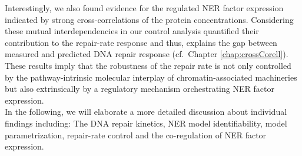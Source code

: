 Interestingly, we also found evidence for the regulated NER factor expression indicated by strong cross-correlations of the protein concentrations. Considering these mutual interdependencies in our control analysis quantified their contribution to the repair-rate response and thus, explains the gap between measured and predicted DNA repair response (cf.\ Chapter \ref{chap:crossCorell}). These results imply that the robustness of the repair rate is not only controlled by the pathway-intrinsic molecular interplay of chromatin-associated machineries but also extrinsically by a regulatory mechanism orchestrating NER factor expression.\\
In the following, we will elaborate a more detailed discussion about individual findings including: The DNA repair kinetics, NER model identifiability, model parametrization, repair-rate control and the co-regulation of NER factor expression.     
%
%

